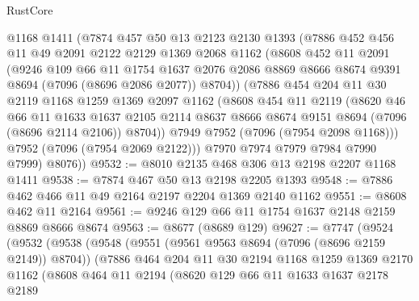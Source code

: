 \begin{lexlean}{RustCore}
\begin{coremodule}
        @1168
        @1411
        (@7874
          @457
          @50
          @13
          @2123
          @2130
          @1393
          (@7886
            @452
            @456
            @11
            @49
            @2091
            @2122
            @2129
            @1369
            @2068
            @1162
            (@8608
              @452
              @11
              @2091
              (@9246
                @109
                @66
                @11
                @1754
                @1637
                @2076
                @2086
                @8869
                @8666
                @8674
                @9391
                @8694
                (@7096 (@8696 @2086 @2077))
                @8704))
            (@7886
              @454
              @204
              @11
              @30
              @2119
              @1168
              @1259
              @1369
              @2097
              @1162
              (@8608
                @454
                @11
                @2119
                (@8620
                  @46
                  @66
                  @11
                  @1633
                  @1637
                  @2105
                  @2114
                  @8637
                  @8666
                  @8674
                  @9151
                  @8694
                  (@7096 (@8696 @2114 @2106))
                  @8704))
              @7949
              @7952
              (@7096 (@7954 @2098 @1168)))
            @7952
            (@7096 (@7954 @2069 @2122)))
          @7970
          @7974
          @7979
          @7984
          @7990
          @7999)
        @8076))
@9532 := @8010 @2135 @468 @306 @13 @2198 @2207 @1168 @1411
@9538 := @7874 @467 @50 @13 @2198 @2205 @1393
@9548 := @7886 @462 @466 @11 @49 @2164 @2197 @2204 @1369 @2140 @1162
@9551 := @8608 @462 @11 @2164
@9561 := @9246 @129 @66 @11 @1754 @1637 @2148 @2159 @8869 @8666 @8674
@9563 := @8677 (@8689 @129)
@9627 := @7747
    (@9524
      (@9532
        (@9538
          (@9548
            (@9551 (@9561 @9563 @8694 (@7096 (@8696 @2159 @2149)) @8704))
            (@7886
              @464
              @204
              @11
              @30
              @2194
              @1168
              @1259
              @1369
              @2170
              @1162
              (@8608
                @464
                @11
                @2194
                (@8620
                  @129
                  @66
                  @11
                  @1633
                  @1637
                  @2178
                  @2189

\end{coremodule}
\end{lexlean}
